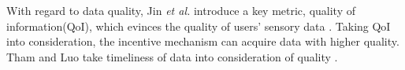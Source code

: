 \documentclass[10pt,conference,compsocconf,letterpaper]{IEEEtran}
\begin{document}
With regard to data quality, %
Jin \emph{et al.} introduce a key metric, quality of information(QoI), which evinces the quality of users’ sensory data%
\cite{jin2015quality}. Taking QoI into consideration, the incentive mechanism can acquire data with higher quality.%
Tham and Luo take timeliness of data into consideration of quality \cite{tham2015quality}. %
\end{document}
